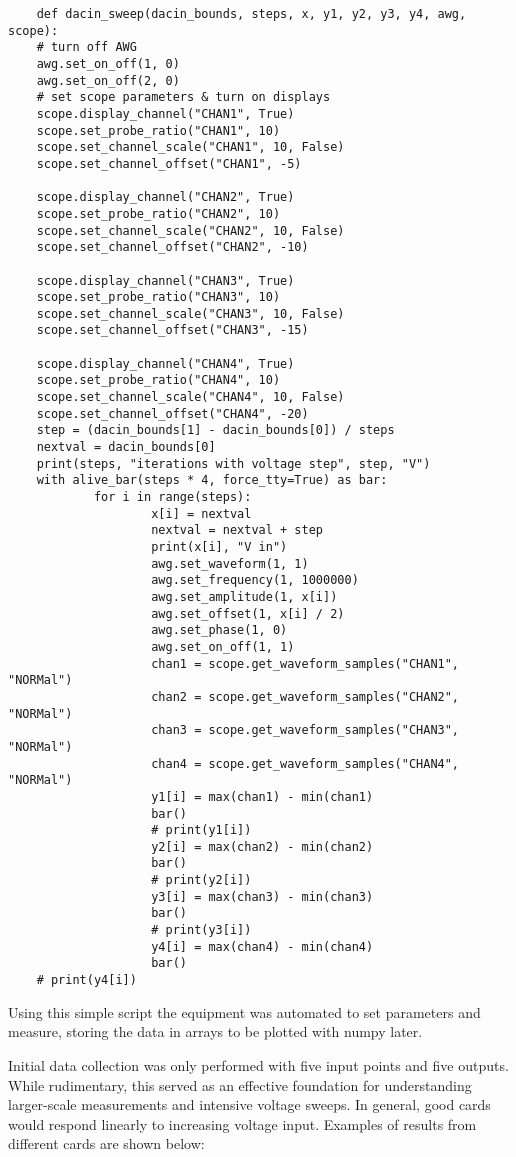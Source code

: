 \begin{lstlisting}
	def dacin_sweep(dacin_bounds, steps, x, y1, y2, y3, y4, awg, scope):
	# turn off AWG
	awg.set_on_off(1, 0)
	awg.set_on_off(2, 0)
	# set scope parameters & turn on displays
	scope.display_channel("CHAN1", True)
	scope.set_probe_ratio("CHAN1", 10)
	scope.set_channel_scale("CHAN1", 10, False)
	scope.set_channel_offset("CHAN1", -5)

	scope.display_channel("CHAN2", True)
	scope.set_probe_ratio("CHAN2", 10)
	scope.set_channel_scale("CHAN2", 10, False)
	scope.set_channel_offset("CHAN2", -10)

	scope.display_channel("CHAN3", True)
	scope.set_probe_ratio("CHAN3", 10)
	scope.set_channel_scale("CHAN3", 10, False)
	scope.set_channel_offset("CHAN3", -15)

	scope.display_channel("CHAN4", True)
	scope.set_probe_ratio("CHAN4", 10)
	scope.set_channel_scale("CHAN4", 10, False)
	scope.set_channel_offset("CHAN4", -20)
	step = (dacin_bounds[1] - dacin_bounds[0]) / steps
	nextval = dacin_bounds[0]
	print(steps, "iterations with voltage step", step, "V")
	with alive_bar(steps * 4, force_tty=True) as bar:
			for i in range(steps):
					x[i] = nextval
					nextval = nextval + step
					print(x[i], "V in")
					awg.set_waveform(1, 1)
					awg.set_frequency(1, 1000000)
					awg.set_amplitude(1, x[i])
					awg.set_offset(1, x[i] / 2)
					awg.set_phase(1, 0)
					awg.set_on_off(1, 1)
					chan1 = scope.get_waveform_samples("CHAN1", "NORMal")
					chan2 = scope.get_waveform_samples("CHAN2", "NORMal")
					chan3 = scope.get_waveform_samples("CHAN3", "NORMal")
					chan4 = scope.get_waveform_samples("CHAN4", "NORMal")
					y1[i] = max(chan1) - min(chan1)
					bar()
					# print(y1[i])
					y2[i] = max(chan2) - min(chan2)
					bar()
					# print(y2[i])
					y3[i] = max(chan3) - min(chan3)
					bar()
					# print(y3[i])
					y4[i] = max(chan4) - min(chan4)
					bar()
	# print(y4[i])
\end{lstlisting}
\FloatBarrier
Using this simple script the equipment was automated to set parameters and measure, storing the data in arrays to be plotted with numpy later. \par
Initial data collection was only performed with five input points and five outputs. While rudimentary, this served as an effective foundation for understanding larger-scale measurements and intensive voltage sweeps. In general, good cards would respond linearly to increasing voltage input. Examples of results from different cards are shown below:
